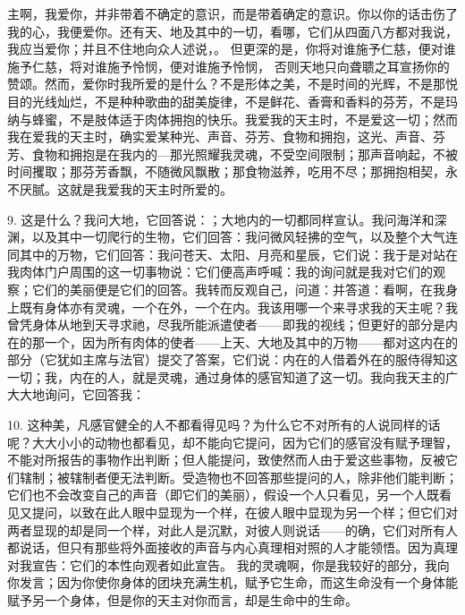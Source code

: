 主啊，我爱你，并非带着不确定的意识，而是带着确定的意识。你以你的话击伤了我的心，我便爱你。还有天、地及其中的一切，看哪，它们从四面八方都对我说，我应当爱你；并且不住地向众人述说，。 但更深的是，你将对谁施予仁慈，便对谁施予仁慈，将对谁施予怜悯，便对谁施予怜悯， 否则天地只向聋聩之耳宣扬你的赞颂。然而，爱你时我所爱的是什么？不是形体之美，不是时间的光辉，不是那悦目的光线灿烂，不是种种歌曲的甜美旋律，不是鲜花、香膏和香料的芬芳，不是玛纳与蜂蜜，不是肢体适于肉体拥抱的快乐。我爱我的天主时，不是爱这一切；然而我在爱我的天主时，确实爱某种光、声音、芬芳、食物和拥抱，这光、声音、芬芳、食物和拥抱是在我内的---那光照耀我灵魂，不受空间限制；那声音响起，不被时间攫取；那芬芳香飘，不随微风飘散；那食物滋养，吃用不尽；那拥抱相契，永不厌腻。这就是我爱我的天主时所爱的。\par

9. 这是什么？我问大地，它回答说：；大地内的一切都同样宣认。我问海洋和深渊，以及其中一切爬行的生物，它们回答：我问微风轻拂的空气，以及整个大气连同其中的万物，它们回答：我问苍天、太阳、月亮和星辰，它们说：我于是对站在我肉体门户周围的这一切事物说：它们便高声呼喊：我的询问就是我对它们的观察；它们的美丽便是它们的回答。我转而反观自己，问道：并答道：看啊，在我身上既有身体亦有灵魂，一个在外，一个在内。我该用哪一个来寻求我的天主呢？我曾凭身体从地到天寻求祂，尽我所能派遣使者——即我的视线；但更好的部分是内在的那一个，因为所有肉体的使者——上天、大地及其中的万物——都对这内在的部分（它犹如主席与法官）提交了答案，它们说：内在的人借着外在的服侍得知这一切；我，内在的人，就是灵魂，通过身体的感官知道了这一切。我向我天主的广大大地询问，它回答我：\par

10. 这种美，凡感官健全的人不都看得见吗？为什么它不对所有的人说同样的话呢？大大小小的动物也都看见，却不能向它提问，因为它们的感官没有赋予理智，不能对所报告的事物作出判断；但人能提问，致使然而人由于爱这些事物，反被它们辖制；被辖制者便无法判断。受造物也不回答那些提问的人，除非他们能判断；它们也不会改变自己的声音（即它们的美丽），假设一个人只看见，另一个人既看见又提问，以致在此人眼中显现为一个样，在彼人眼中显现为另一个样；但它们对两者显现的却是同一个样，对此人是沉默，对彼人则说话——的确，它们对所有人都说话，但只有那些将外面接收的声音与内心真理相对照的人才能领悟。因为真理对我宣告：它们的本性向观者如此宣告。 我的灵魂啊，你是我较好的部分，我向你发言；因为你使你身体的团块充满生机，赋予它生命，而这生命没有一个身体能赋予另一个身体，但是你的天主对你而言，却是生命中的生命。\par

